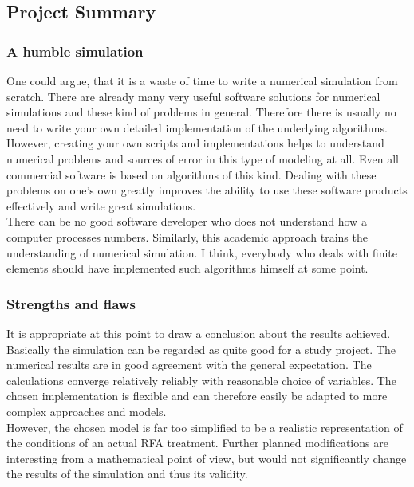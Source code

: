 \documentclass[parskip=half, titlepage=yes, 12pt, BCOR=12mm, DIV=calc]{scrartcl}
\begin{document}
\subsection{Project Summary}
\subsubsection{A humble simulation}
One could argue, that it is a waste of time to write a numerical simulation from scratch. There are already many very useful software solutions for numerical simulations and these kind of problems in general. Therefore there is usually no need to write your own detailed implementation of the underlying algorithms. \\

However, creating your own scripts and implementations helps to understand numerical problems and sources of error in this type of modeling at all. Even all commercial software is based on algorithms of this kind. Dealing with these problems on one's own greatly improves the ability to use these software products effectively and write great simulations.\\

There can be no good software developer who does not understand how a computer processes numbers. Similarly, this academic approach trains the understanding of numerical simulation. I think, everybody who deals with finite elements should have implemented such algorithms himself at some point. \\

\subsubsection{Strengths and flaws}
It is appropriate at this point to draw a conclusion about the results achieved. \\
Basically the simulation can be regarded as quite good for a study project. 
The numerical results are in good agreement with the general expectation. The calculations converge relatively reliably with reasonable choice of variables.
The chosen implementation is flexible and can therefore easily be adapted to more complex approaches and models. \\
However, the chosen model is far too simplified to be a realistic representation of the conditions of an actual RFA treatment. Further planned modifications are interesting from a mathematical point of view, but would not significantly change the results of the simulation and thus its validity.
\end{document}
